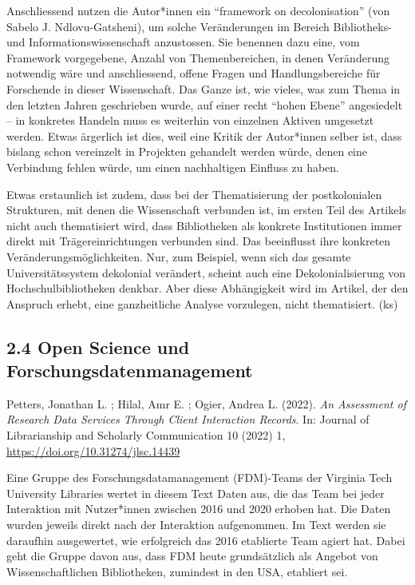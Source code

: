 \documentclass[a4paper,
fontsize=11pt,
oneside,
numbers=noperiodatend,
parskip=half-,
bibliography=totoc,
final
]{scrartcl}
\begin{document}
Anschliessend nutzen die Autor*innen ein \enquote{framework on
decolonisation} (von Sabelo J. Ndlovu-Gatsheni), um solche Veränderungen
im Bereich Bibliotheks- und Informationswissenschaft anzustossen. Sie
benennen dazu eine, vom Framework vorgegebene, Anzahl von
Themenbereichen, in denen Veränderung notwendig wäre und anschliessend,
offene Fragen und Handlungsbereiche für Forschende in dieser
Wissenschaft. Das Ganze ist, wie vieles, was zum Thema in den letzten
Jahren geschrieben wurde, auf einer recht \enquote{hohen Ebene}
angesiedelt -- in konkretes Handeln muss es weiterhin von einzelnen
Aktiven umgesetzt werden. Etwas ärgerlich ist dies, weil eine Kritik der
Autor*innen selber ist, dass bislang schon vereinzelt in Projekten
gehandelt werden würde, denen eine Verbindung fehlen würde, um einen
nachhaltigen Einfluss zu haben.

Etwas erstaunlich ist zudem, dass bei der Thematisierung der
postkolonialen Strukturen, mit denen die Wissenschaft verbunden ist, im
ersten Teil des Artikels nicht auch thematisiert wird, dass Bibliotheken
als konkrete Institutionen immer direkt mit Trägereinrichtungen
verbunden sind. Das beeinflusst ihre konkreten
Veränderungsmöglichkeiten. Nur, zum Beispiel, wenn sich das gesamte
Universitätssystem dekolonial verändert, scheint auch eine
Dekolonialisierung von Hochschulbibliotheken denkbar. Aber diese
Abhängigkeit wird im Artikel, der den Anspruch erhebt, eine
ganzheitliche Analyse vorzulegen, nicht thematisiert. (ks)

\hypertarget{open-science-und-forschungsdatenmanagement}{%
\subsection{2.4 Open Science und
Forschungsdatenmanagement}\label{open-science-und-forschungsdatenmanagement}}

Petters, Jonathan L. ; Hilal, Amr E. ; Ogier, Andrea L. (2022). \emph{An
Assessment of Research Data Services Through Client Interaction
Records}. In: Journal of Librarianship and Scholarly Communication 10
(2022) 1, \url{https://doi.org/10.31274/jlsc.14439}

Eine Gruppe des Forschungsdatamanagement (FDM)-Teams der Virginia Tech
University Libraries wertet in diesem Text Daten aus, die das Team bei
jeder Interaktion mit Nutzer*innen zwischen 2016 und 2020 erhoben hat.
Die Daten wurden jeweils direkt nach der Interaktion aufgenommen. Im
Text werden sie daraufhin ausgewertet, wie erfolgreich das 2016
etablierte Team agiert hat. Dabei geht die Gruppe davon aus, dass FDM
heute grundsätzlich als Angebot von Wissenschaftlichen Bibliotheken,
zumindest in den USA, etabliert sei.
\end{document}
